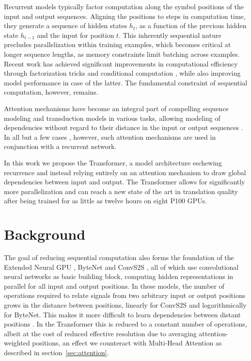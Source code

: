 \documentclass{article}
\begin{document}
Recurrent models typically factor computation along the symbol positions of the input and output sequences. Aligning the positions to steps in computation time, they generate a sequence of hidden states $h_t$, as a function of the previous hidden state $h_{t-1}$ and the input for position $t$. This inherently sequential nature precludes parallelization within training examples, which becomes critical at longer sequence lengths, as memory constraints limit batching across examples.
Recent work has achieved significant improvements in computational efficiency through factorization tricks \citep{Kuchaiev2017Factorization} and conditional computation \citep{shazeer2017outrageously}, while also improving model performance in case of the latter. The fundamental constraint of sequential computation, however, remains.



Attention mechanisms have become an integral part of compelling sequence modeling and transduction models in various tasks, allowing modeling of dependencies without regard to their distance in the input or output sequences \citep{bahdanau2014neural, structuredAttentionNetworks}. In all but a few cases \citep{decomposableAttnModel}, however, such attention mechanisms are used in conjunction with a recurrent network.



In this work we propose the Transformer, a model architecture eschewing recurrence and instead relying entirely on an attention mechanism to draw global dependencies between input and output. The Transformer allows for significantly more parallelization and can reach a new state of the art in translation quality after being trained for as little as twelve hours on eight P100 GPUs. 


%
 
\section{Background}

The goal of reducing sequential computation also forms the foundation of the Extended Neural GPU \citep{extendedngpu}, ByteNet \citep{NalBytenet2017} and ConvS2S \citep{JonasFaceNet2017}, all of which use convolutional neural networks as basic building block, computing hidden representations in parallel for all input and output positions. In these models, the number of operations required to relate signals from two arbitrary input or output positions grows in the distance between positions, linearly for ConvS2S and logarithmically for ByteNet. This makes it more difficult to learn dependencies between distant positions \citep{hochreiter2001gradient}. In the Transformer this is reduced to a constant number of operations, albeit at the cost of reduced effective resolution due to averaging attention-weighted positions, an effect we counteract with Multi-Head Attention as described in section~\ref{sec:attention}. 
\end{document}
